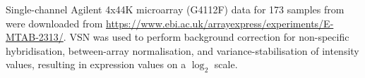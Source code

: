 
Single-channel Agilent 4x44K microarray (G4112F) data for 173 samples from \autocite{sobolev2016AdjuvantedInfluenzaH1N1Vaccination} were downloaded from \url{https://www.ebi.ac.uk/arrayexpress/experiments/E-MTAB-2313/}.
VSN\autocite{huber2002VarianceStabilizationApplied} was used to perform background correction for non-specific hybridisation, between-array normalisation, and variance-stabilisation of intensity values, resulting in expression values on a $\log_2$ scale.

